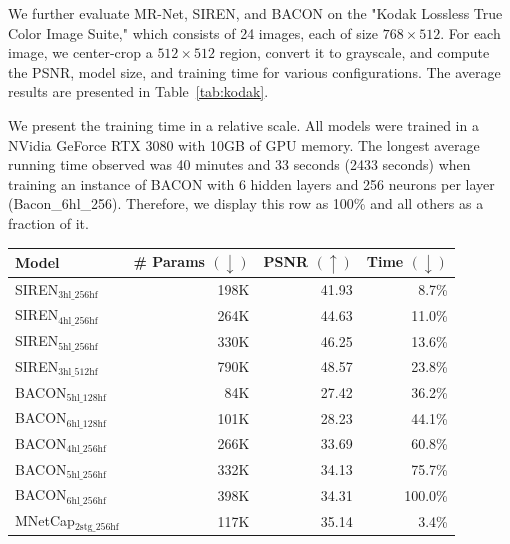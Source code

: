 We further evaluate MR-Net, SIREN, and BACON on the "Kodak Lossless True Color Image Suite," which consists of 24 images, each of size $768 \times 512$. For each image, we center-crop a $512 \times 512$ region, convert it to grayscale, and compute the PSNR, model size, and training time for various configurations. The average results are presented in Table~\ref{tab:kodak}.

We present the training time in a relative scale. All models were trained in a NVidia GeForce RTX 3080 with 10GB of GPU memory. The longest average running time observed was 40 minutes and 33 seconds (2433 seconds) when training an instance of BACON with 6 hidden layers and 256 neurons per layer (Bacon\_6hl\_256). Therefore, we display this row as 100\% and all others as a fraction of it.


\begin{table}[!h]
\centering
\small
\begin{tabular}{|l|r|r|r|}
\hline
Model                    & \# Params $(\downarrow)$ & PSNR $(\uparrow)$ & Time $(\downarrow)$ \\
\hline
SIREN$_\text{3hl\_256hf}$        & 198K      & 41.93    & 8.7\%       \\
SIREN$_\text{4hl\_256hf}$        & 264K      & 44.63    & 11.0\%      \\
SIREN$_\text{5hl\_256hf}$        & 330K      & 46.25    & 13.6\%      \\
SIREN$_\text{3hl\_512hf}$        & 790K      & 48.57    & 23.8\%      \\
\hline
BACON$_\text{5hl\_128hf}$        & 84K       & 27.42    & 36.2\%      \\
BACON$_\text{6hl\_128hf}$        & 101K      & 28.23    & 44.1\%      \\
BACON$_\text{4hl\_256hf}$        & 266K      & 33.69    & 60.8\%      \\
BACON$_\text{5hl\_256hf}$        & 332K      & 34.13    & 75.7\%      \\
BACON$_\text{6hl\_256hf}$        & 398K      & 34.31    & 100.0\%     \\
\hline
MNetCap$_\text{2stg\_256hf}$    & 117K      & 35.14    & 3.4\%       \\

\end{tabular}
\end{table}
